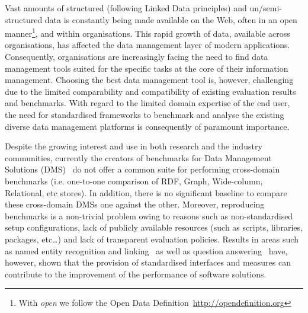 \documentclass{llncs}
\begin{document}
Vast amounts of structured (following Linked Data principles) and un/semi-structured data is constantly being made available on the Web, often in an open manner\footnote{With \emph{open} we follow the Open Data Definition~\url{http://opendefinition.org}}, and within organisations.
This rapid growth of data, available across organisations, has affected the data management layer of modern applications. 
Consequently,
organisations are increasingly facing the need to find data management tools suited for the specific tasks at the core of their information management. 
Choosing the best data management tool is, however, challenging due to the limited comparability and compatibility of existing evaluation results and benchmarks. 
With regard to the limited domain expertise of the end user, 
the need for standardised frameworks to benchmark and analyse the existing diverse data management platforms is consequently of paramount importance.

Despite the growing interest and use in both research and the industry communities, currently 
the creators of benchmarks for Data Management Solutions (DMS)~\cite{alucc2014diversified,Bizer2009TheBS} do not offer a common 
suite for performing cross-domain benchmarks (i.e. one-to-one comparison of RDF, Graph, Wide-column, Relational, etc stores). In addition, there is no significant baseline to compare these cross-domain DMSs one against the other. 
Moreover, reproducing benchmarks is a non-trivial problem owing to reasons such as non-standardised setup configurations, lack of publicly available resources (such as scripts, libraries, packages, etc\dots) and lack of transparent evaluation policies. Results in areas such as named entity recognition and linking~\cite{gerbil} as well as question answering~\cite{bioasq,qald} have, however, shown that the provision of standardised interfaces and measures can contribute to the improvement of the performance of software solutions. 
    
\end{document}
